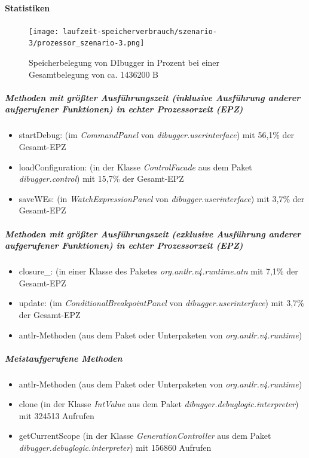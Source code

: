 \documentclass[parskip=full]{scrartcl}
\begin{document}
        \paragraph{Statistiken}
        \begin{figure}[!h]
            \centering
            \texttt{[image: laufzeit-speicherverbrauch/szenario-3/prozessor\_szenario-3.png]}
            \caption{Speicherbelegung von DIbugger in Prozent bei einer Gesamtbelegung von ca. 1436200 B}
        \end{figure}   
        \subparagraph{Methoden mit größter Ausführungszeit (inklusive Ausführung anderer aufgerufener Funktionen) in echter Prozessorzeit (EPZ)}
        \begin{itemize}
            \item{startDebug}: (im \textit{CommandPanel} von \textit{dibugger.userinterface}) mit 56,1\% der Gesamt-EPZ
            \item{loadConfiguration}: (in der Klasse \textit{ControlFacade} aus dem Paket \textit{dibugger.control}) mit 15,7\% der Gesamt-EPZ
            \item{saveWEs}: (in \textit{WatchExpressionPanel} von \textit{dibugger.userinterface}) mit 3,7\% der Gesamt-EPZ
        \end{itemize}
        \subparagraph{Methoden mit größter Ausführungszeit (exklusive Ausführung anderer aufgerufener Funktionen) in echter Prozessorzeit (EPZ)}
        \begin{itemize}
            \item{closure\_}: (in einer Klasse des Paketes \textit{org.antlr.v4.runtime.atn} mit 7,1\% der Gesamt-EPZ
            \item{update}: (im \textit{ConditionalBreakpointPanel} von \textit{dibugger.userinterface}) mit 3,7\% der Gesamt-EPZ 
            \item{antlr-Methoden} (aus dem Paket oder Unterpaketen von \textit{org.antlr.v4.runtime}) 
        \end{itemize}
        \subparagraph{Meistaufgerufene Methoden}
        \begin{itemize}
            \item{antlr-Methoden} (aus dem Paket oder Unterpaketen von \textit{org.antlr.v4.runtime}) 
            \item{clone} (in der Klasse \textit{IntValue} aus dem Paket \textit{dibugger.debuglogic.interpreter}) mit 324513 Aufrufen
            \item{getCurrentScope} (in der Klasse \textit{GenerationController} aus dem Paket \textit{dibugger.debuglogic.interpreter}) mit 156860 Aufrufen
        \end{itemize}
\end{document}
